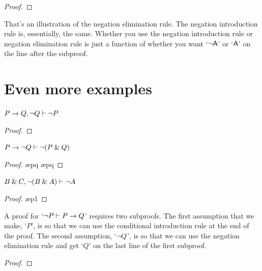 \begin{proof}
	 \pr{}	
	 \pr{}
	\open
		\as{}
	\close
\end{proof}
That's an illustration of the negation elimination rule. The negation introduction rule is, essentially, the same. Whether you use the negation introduction rule or negation elimination rule is just a function of whether you want `${\neg} \mathsf{A}$' or `$\mathsf{A}$' on the line after the subproof.


\newpage

\section{Even more examples}

\begin{earg}

\item $P \rightarrow Q, {\neg} Q \vdash {\neg} P$

\begin{proof}
	 \pr{}
	 \pr{}	
	\open
		 \as{}
		 
		 
	\close
	 
\end{proof}


\item $P \rightarrow {\neg} Q \vdash {\neg}(P \mathbin{\&} Q)$

\begin{proof}
	 \pr{}	
	\open
		 \as{}
		 \ae{pq}
		 
		 \ae{pq}
	\close
	 
\end{proof}

\filbreak
\item $B \mathbin{\&} C, {\neg}(B \mathbin{\&} A) \vdash {\neg} A$

\begin{proof}
	 \pr{}	
	 \pr{}
	\open
		 \as{}
		 \ae{p1}
		 
		 
	\close
	 
\end{proof}

\item A proof for `${\neg} P \vdash P \rightarrow Q$' requires two subproofs. The first assumption that we make, `$P$', is so that we can use the conditional introduction rule at the end of the proof. The second assumption, `${\neg} Q$', is so that we can use the negation elimination rule and get `$Q$' on the last line of the first subproof.

\begin{proof}
	 \pr{}	
	\open
			\as{}
		\open
			 \as{}
			 
			 
		\close
		 
	\close
	 
\end{proof}


\end{earg}



